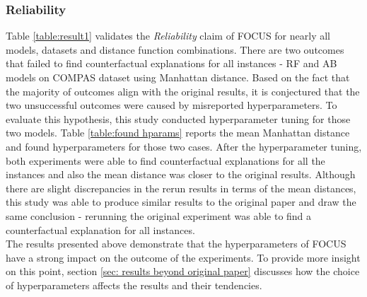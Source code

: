 \subsubsection{Reliability}
Table \ref{table:result1} validates the \textit{Reliability} claim of FOCUS for nearly all models, datasets and distance function combinations. There are two outcomes that failed to find counterfactual explanations for all instances - RF and AB models on COMPAS dataset using Manhattan distance. Based on the fact that the majority of outcomes align with the original results, it is conjectured that the two unsuccessful outcomes were caused by misreported hyperparameters. To evaluate this hypothesis, this study conducted hyperparameter tuning for those two models. Table \ref{table:found hparams} reports the mean Manhattan distance and found hyperparameters for those two cases. After the hyperparameter tuning, both experiments were able to find counterfactual explanations for all the instances and also the mean distance was closer to the original results.
Although there are slight discrepancies in the rerun results in terms of the mean distances, this study was able to produce similar results to the original paper and draw the same conclusion - rerunning the original experiment was able to find a counterfactual explanation for all instances.\\
The results presented above demonstrate that the hyperparameters of FOCUS have a strong impact on the outcome of the experiments. To provide more insight on this point, section \ref{sec: results beyond original paper} discusses how the choice of hyperparameters affects the results and their tendencies.

